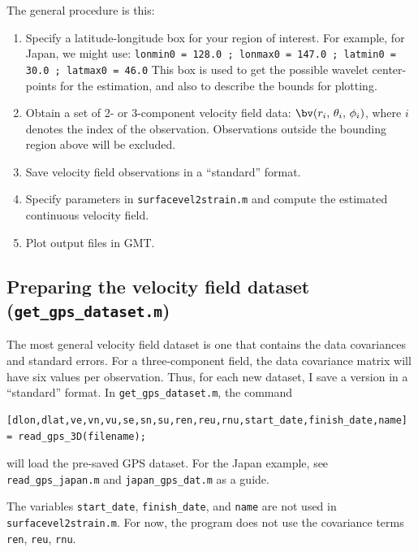 \documentclass[11pt,titlepage,fleqn]{article}
\begin{document}
The general procedure is this:
%
\begin{enumerate}
\item Specify a latitude-longitude box for your region of interest. For example, for Japan, we might use:
%
\verb+lonmin0 = 128.0 ; lonmax0 = 147.0 ; latmin0 = 30.0 ; latmax0 = 46.0+
%
This box is used to get the possible wavelet center-points for the estimation, and also to describe the bounds for plotting.

\item Obtain a set of 2- or 3-component velocity field data: $\bv(r_i,\,\theta_i,\,\phi_i)$, where $i$ denotes the index of the observation. Observations outside the bounding region above will be excluded.

\item Save velocity field observations in a ``standard'' format.

\item Specify parameters in \verb+surfacevel2strain.m+ and compute the estimated continuous velocity field.

\item Plot output files in GMT.
\end{enumerate}


\subsection{Preparing the velocity field dataset ({\tt get\_gps\_dataset.m})}

The most general velocity field dataset is one that contains the data covariances and standard errors.  For a three-component field, the data covariance matrix will have six values per observation.  Thus, for each new dataset, I save a version in a ``standard'' format.
In \verb+get_gps_dataset.m+, the command
%
\begin{verbatim}
[dlon,dlat,ve,vn,vu,se,sn,su,ren,reu,rnu,start_date,finish_date,name] = read_gps_3D(filename);
\end{verbatim}
%
will load the pre-saved GPS dataset.  For the Japan example, see {\tt read\_gps\_japan.m} and {\tt japan\_gps\_dat.m} as a guide.

The variables \verb+start_date+, \verb+finish_date+, and \verb+name+ are not used in \verb+surfacevel2strain.m+. For now, the program does not use the covariance terms \verb+ren+, \verb+reu+, \verb+rnu+.

\end{document}
